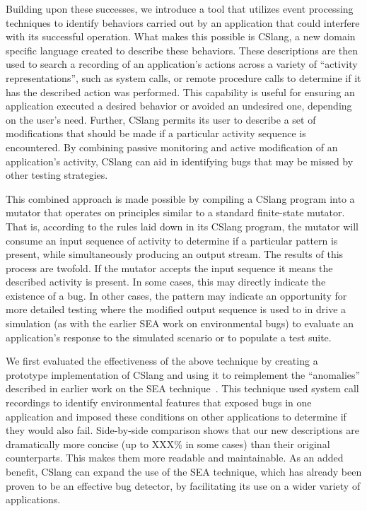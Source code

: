 Building upon these successes,
we introduce a tool
that utilizes event processing techniques
to identify
behaviors carried out by an application
that could interfere with its successful operation.
What makes this possible is CSlang,
a new domain specific language
created to describe these behaviors.
These descriptions are then used
to search a recording of an application's actions
across a variety of ``activity representations'',
such as system calls,
or remote procedure calls
to determine if it has
the described action was
performed.
This capability is useful
for ensuring an application executed a desired behavior
or avoided an undesired one,
depending on the user's need.
Further, CSlang permits
its user to describe a set of modifications
that should be made
if a particular activity sequence is encountered.
By combining passive monitoring and active modification
of an application's activity,
CSlang can aid in identifying bugs
that may be missed by other testing strategies.

This combined approach is made possible
by compiling a CSlang program
into a mutator
that operates on principles similar
to a standard finite-state mutator.
That is,
according to the rules laid down in its CSlang program,
the mutator will consume an input sequence of activity
to determine if a particular pattern is present,
while simultaneously producing an output stream.
The results of this process are twofold.
If the mutator accepts the input sequence
it means the described activity is present.
In some cases,
this may directly indicate
the existence of a bug.
In other cases,
the pattern may
indicate an opportunity
for more detailed testing
where the modified output sequence is used
to in drive a simulation (as with the earlier SEA work on environmental bugs)
to evaluate an application's response to the simulated scenario
or to populate a test suite.

We first evaluated the effectiveness of the above technique
by creating a prototype implementation of CSlang
and using it to
reimplement the ``anomalies''
described in earlier work on the SEA technique~\cite{DBLP:conf/issre/MooreCFW19}.
This technique used system call recordings
to identify environmental features that
exposed bugs in one application
and imposed these conditions on other applications
to determine if they would also fail.
Side-by-side comparison shows that our new
descriptions are dramatically more concise (up to XXX\% in some cases)
than their original counterparts.
This makes them
more readable
and maintainable.
As an added benefit,
CSlang can expand the use of the SEA technique,
which has already been proven
to be an effective bug detector,
by facilitating its use
on a wider variety of applications.


